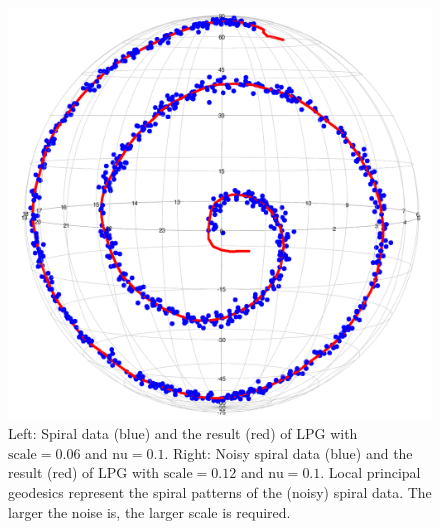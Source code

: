 \begin{figure}[h]
    \includegraphics[scale=0.1]{figures/LPG(spiral_noisy).png}
    \caption{Left: Spiral data (blue) and the result (red) of LPG with $\mbox{scale}=0.06$ and $\mbox{nu}=0.1$. Right: Noisy spiral data (blue) and the result (red) of LPG with $\mbox{scale} = 0.12$ and $\mbox{nu} = 0.1$. Local principal geodesics represent the spiral patterns of the (noisy) spiral data. The larger the noise is, the larger scale is required.}
    \label{fig:spiral}
\end{figure}

